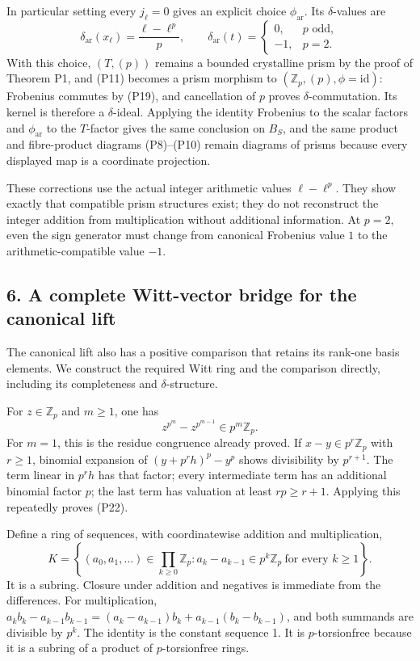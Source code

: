 \documentclass[
]{article}
\begin{document}
In particular setting every \(j_\ell=0\) gives an explicit choice
\(\phi_{\mathrm{ar}}\). Its \(\delta\)-values are \[
\delta_{\mathrm{ar}}(x_\ell)=\frac{\ell-\ell^p}{p},
\qquad
\delta_{\mathrm{ar}}(t)=
\begin{cases}0,&p\text{ odd},\\-1,&p=2.\end{cases}
\tag{P21}
\] With this choice, \((T,(p))\) remains a bounded crystalline prism by
the proof of Theorem P1, and (P11) becomes a prism morphism to
\((\mathbb Z_p,(p),\phi=\mathrm{id})\): Frobenius commutes by (P19), and
cancellation of \(p\) proves \(\delta\)-commutation. Its kernel is
therefore a \(\delta\)-ideal. Applying the identity Frobenius to the
scalar factors and \(\phi_{\mathrm{ar}}\) to the \(T\)-factor gives the
same conclusion on \(B_S\), and the same product and fibre-product
diagrams (P8)--(P10) remain diagrams of prisms because every displayed
map is a coordinate projection.

These corrections use the actual integer arithmetic values
\(\ell-\ell^p\). They show exactly that compatible prism structures
exist; they do not reconstruct the integer addition from multiplication
without additional information. At \(p=2\), even the sign generator must
change from canonical Frobenius value \(1\) to the arithmetic-compatible
value \(-1\).

\subsection{6. A complete Witt-vector bridge for the canonical
lift}\label{a-complete-witt-vector-bridge-for-the-canonical-lift}

The canonical lift also has a positive comparison that retains its
rank-one basis elements. We construct the required Witt ring and the
comparison directly, including its completeness and
\(\delta\)-structure.

For \(z\in\mathbb Z_p\) and \(m\ge1\), one has \[
z^{p^m}-z^{p^{m-1}}\in p^m\mathbb Z_p.
\tag{P22}
\] For \(m=1\), this is the residue congruence already proved. If
\(x-y\in p^r\mathbb Z_p\) with \(r\ge1\), binomial expansion of
\((y+p^rh)^p-y^p\) shows divisibility by \(p^{r+1}\). The term linear in
\(p^rh\) has that factor; every intermediate term has an additional
binomial factor \(p\); the last term has valuation at least
\(rp\ge r+1\). Applying this repeatedly proves (P22).

Define a ring of sequences, with coordinatewise addition and
multiplication, \[
K=\left\{(a_0,a_1,\ldots)\in\prod_{k\ge0}\mathbb Z_p:
a_k-a_{k-1}\in p^k\mathbb Z_p\ \text{for every }k\ge1\right\}.
\tag{P23}
\] It is a subring. Closure under addition and negatives is immediate
from the differences. For multiplication,
\(a_kb_k-a_{k-1}b_{k-1}=(a_k-a_{k-1})b_k+a_{k-1}(b_k-b_{k-1})\), and
both summands are divisible by \(p^k\). The identity is the constant
sequence 1. It is \(p\)-torsionfree because it is a subring of a product
of \(p\)-torsionfree rings.
\end{document}
